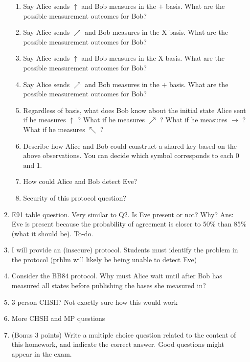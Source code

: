 \documentclass[12pt]{article}
\begin{document}
\begin{enumerate}[font=\bfseries]
        \begin{enumerate}
            \item Say Alice sends $\uparrow$ and Bob measures in the $+$ basis. What are the possible measurement outcomes for Bob?
            \item Say Alice sends $\nearrow$ and Bob measures in the X basis. What are the possible measurement outcomes for Bob?
            \item Say Alice sends $\uparrow$ and Bob measures in the X basis. What are the possible measurement outcomes for Bob?
            \item Say Alice sends $\nearrow$ and Bob measures in the $+$ basis. What are the possible measurement outcomes for Bob?
            \item Regardless of basis, what does Bob know about the initial state Alice sent if he measures $\uparrow$ ? What if he measures $\nearrow$ ? What if he measures  $\rightarrow$ ? What if he measures $\nwarrow$ ?
            \item Describe how Alice and Bob could construct a shared key based on the above observations. You can decide which symbol corresponds to each 0 and 1. 
            \item How could Alice and Bob detect Eve?
            \item Security of this protocol question?
        \end{enumerate}
    \item E91 table question. Very similar to Q2. Is Eve present or not? Why? Ans: Eve is present because the probability of agreement is closer to 50\% than 85\% (what it should be). To-do.
    \item I will provide an (insecure) protocol. Students must identify the problem in the protocol (prblm will likely be being unable to detect Eve)
    \item Consider the BB84 protocol. Why must Alice wait until after Bob has measured all states before publishing the bases she measured in?
    \item 3 person CHSH? Not exactly sure how this would work
    \item More CHSH and MP questions
    \item (Bonus 3 points) Write a multiple choice question related to the content of this homework, and indicate the correct answer. Good questions might appear in the exam.
\end{enumerate}
\end{document}
